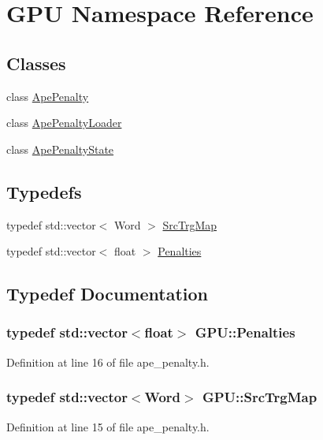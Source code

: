 \hypertarget{namespaceGPU}{}\section{G\+PU Namespace Reference}
\label{namespaceGPU}
\subsection*{Classes}
\begin{DoxyCompactItemize}
\item 
class \hyperlink{classGPU_1_1ApePenalty}{Ape\+Penalty}
\item 
class \hyperlink{classGPU_1_1ApePenaltyLoader}{Ape\+Penalty\+Loader}
\item 
class \hyperlink{classGPU_1_1ApePenaltyState}{Ape\+Penalty\+State}
\end{DoxyCompactItemize}
\subsection*{Typedefs}
\begin{DoxyCompactItemize}
\item 
typedef std\+::vector$<$ Word $>$ \hyperlink{namespaceGPU_af00d3987455a7200ce4556e53eb3d228}{Src\+Trg\+Map}
\item 
typedef std\+::vector$<$ float $>$ \hyperlink{namespaceGPU_ac29cf59ddc71f2086318cc8a5b166269}{Penalties}
\end{DoxyCompactItemize}


\subsection{Typedef Documentation}
\subsubsection[{\texorpdfstring{Penalties}{Penalties}}]{\setlength{\rightskip}{0pt plus 5cm}typedef std\+::vector$<$float$>$ {\bf G\+P\+U\+::\+Penalties}}\hypertarget{namespaceGPU_ac29cf59ddc71f2086318cc8a5b166269}{}\label{namespaceGPU_ac29cf59ddc71f2086318cc8a5b166269}


Definition at line 16 of file ape\+\_\+penalty.\+h.

\subsubsection[{\texorpdfstring{Src\+Trg\+Map}{SrcTrgMap}}]{\setlength{\rightskip}{0pt plus 5cm}typedef std\+::vector$<$Word$>$ {\bf G\+P\+U\+::\+Src\+Trg\+Map}}\hypertarget{namespaceGPU_af00d3987455a7200ce4556e53eb3d228}{}\label{namespaceGPU_af00d3987455a7200ce4556e53eb3d228}


Definition at line 15 of file ape\+\_\+penalty.\+h.


